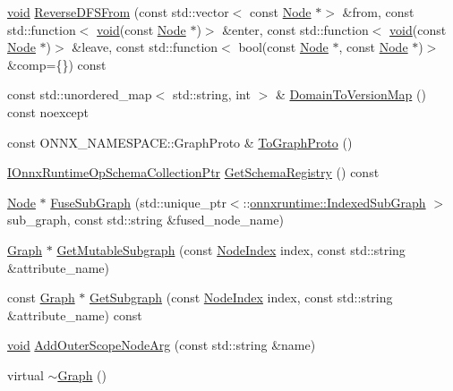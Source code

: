 \begin{DoxyCompactItemize}
\item 
\mbox{\hyperlink{mlasi_8h_a88f941d423cb2a819b70a1358982b1a6}{void}} \mbox{\hyperlink{classonnxruntime_1_1Graph_ab9ff5067db6b6dade2962c9e77cf6591}{Reverse\+D\+F\+S\+From}} (const std\+::vector$<$ const \mbox{\hyperlink{classonnxruntime_1_1Node}{Node}} $\ast$$>$ \&from, const std\+::function$<$ \mbox{\hyperlink{mlasi_8h_a88f941d423cb2a819b70a1358982b1a6}{void}}(const \mbox{\hyperlink{classonnxruntime_1_1Node}{Node}} $\ast$)$>$ \&enter, const std\+::function$<$ \mbox{\hyperlink{mlasi_8h_a88f941d423cb2a819b70a1358982b1a6}{void}}(const \mbox{\hyperlink{classonnxruntime_1_1Node}{Node}} $\ast$)$>$ \&leave, const std\+::function$<$ bool(const \mbox{\hyperlink{classonnxruntime_1_1Node}{Node}} $\ast$, const \mbox{\hyperlink{classonnxruntime_1_1Node}{Node}} $\ast$)$>$ \&comp=\{\}) const
\item 
const std\+::unordered\+\_\+map$<$ std\+::string, int $>$ \& \mbox{\hyperlink{classonnxruntime_1_1Graph_a46d1e58cbb0615f3e9733f15fb7aa1cc}{Domain\+To\+Version\+Map}} () const noexcept
\item 
const O\+N\+N\+X\+\_\+\+N\+A\+M\+E\+S\+P\+A\+C\+E\+::\+Graph\+Proto \& \mbox{\hyperlink{classonnxruntime_1_1Graph_a9fdaa2f3924b5b06a2a6cda0821d9d6a}{To\+Graph\+Proto}} ()
\item 
\mbox{\hyperlink{namespaceonnxruntime_af9a8d0a11a8e0ccd714c7ddc2fabe41d}{I\+Onnx\+Runtime\+Op\+Schema\+Collection\+Ptr}} \mbox{\hyperlink{classonnxruntime_1_1Graph_a75e0404bbe9fbd90955553ecdf777cbe}{Get\+Schema\+Registry}} () const
\item 
\mbox{\hyperlink{classonnxruntime_1_1Node}{Node}} $\ast$ \mbox{\hyperlink{classonnxruntime_1_1Graph_a4d09a87a881969281aaca973ec5bebd4}{Fuse\+Sub\+Graph}} (std\+::unique\+\_\+ptr$<$\+::\mbox{\hyperlink{structonnxruntime_1_1IndexedSubGraph}{onnxruntime\+::\+Indexed\+Sub\+Graph}} $>$ sub\+\_\+graph, const std\+::string \&fused\+\_\+node\+\_\+name)
\item 
\mbox{\hyperlink{classonnxruntime_1_1Graph}{Graph}} $\ast$ \mbox{\hyperlink{classonnxruntime_1_1Graph_a6627ca765d7547bcd1e5fca2cd53233e}{Get\+Mutable\+Subgraph}} (const \mbox{\hyperlink{namespaceonnxruntime_af8773b5c12b5d8fd9292eb2e268df760}{Node\+Index}} index, const std\+::string \&attribute\+\_\+name)
\item 
const \mbox{\hyperlink{classonnxruntime_1_1Graph}{Graph}} $\ast$ \mbox{\hyperlink{classonnxruntime_1_1Graph_a863474f1c1ba9e413990640996e2e154}{Get\+Subgraph}} (const \mbox{\hyperlink{namespaceonnxruntime_af8773b5c12b5d8fd9292eb2e268df760}{Node\+Index}} index, const std\+::string \&attribute\+\_\+name) const
\item 
\mbox{\hyperlink{mlasi_8h_a88f941d423cb2a819b70a1358982b1a6}{void}} \mbox{\hyperlink{classonnxruntime_1_1Graph_ac88de928fb7e920ec2028ac5f049ecc3}{Add\+Outer\+Scope\+Node\+Arg}} (const std\+::string \&name)
\item 
virtual \mbox{\hyperlink{classonnxruntime_1_1Graph_a798f54e43ac6ba2b10cf026a6365cdc5}{$\sim$\+Graph}} ()
\end{DoxyCompactItemize}
